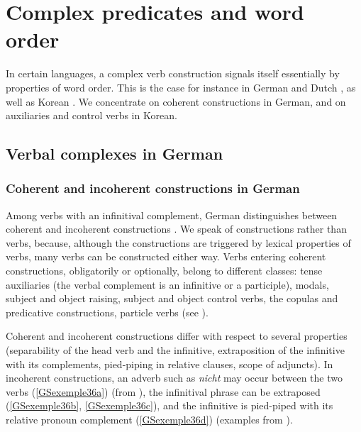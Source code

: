 \documentclass[output=paper
                ,modfonts
                ,nonflat
	        ,collection
	        ,collectionchapter
	        ,collectiontoclongg
 	        ,biblatex
                ,babelshorthands
                ,newtxmath
                ,draftmode
                ,colorlinks, citecolor=brown
]{./langsci/langscibook}
\begin{document}
{\section{Complex predicates and word order}\label{GSsection4}


In certain languages, a complex verb construction signals itself essentially by properties of word order. This is the case for instance in German \citep{HN89b, HN94a, Kiss94, Kiss95a, HN98a, Kathol98b, Kathol2000a, Meurers2000b-Short, DM2002, dKM2001a, Mueller2002b, Mueller2003a, MuellerCopula} and Dutch \citep{Rentier94, BvN98a}, as well as Korean \citep{ Sells1991, Chung98a-u, Yoo2003, Kim2016a-u}. We concentrate on coherent constructions in German, and on auxiliaries and control verbs in Korean.    

\subsection{Verbal complexes in German}\label{GSsection4.1}

\subsubsection{Coherent and incoherent constructions in German}\label{GSsection4.1.1}

Among verbs with an infinitival complement, German distinguishes between coherent and incoherent constructions \citep{gunnar1955studien}. We speak of constructions rather than verbs, because, although the constructions are triggered by lexical properties of verbs, many verbs can be constructed either way. Verbs entering coherent constructions, obligatorily or optionally, belong to different classes: tense auxiliaries (the verbal complement is an infinitive or a participle), modals, subject and object raising, subject and object control verbs, the copulas and predicative constructions, particle verbs (see \citealt{Mueller2002b}).

Coherent and incoherent constructions differ with respect to several properties (separability of the head verb and the infinitive, extraposition of the infinitive with its complements, pied-piping in relative clauses, scope of adjuncts). In incoherent constructions, an adverb such as \emph{nicht} may occur between the two verbs (\ref{GSexemple36a}) (from \citealt{Mueller2002b}), the infinitival phrase can be extraposed (\ref{GSexemple36b}, \ref{GSexemple36c}), and the infinitive is pied-piped with its relative pronoun complement (\ref{GSexemple36d}) (examples from \citealt{HN98a}).

}
\end{document}
